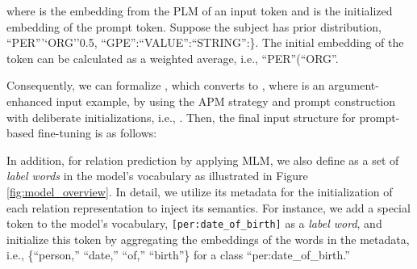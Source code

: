 \documentclass[11pt]{article}
\begin{document}
where  is the embedding from the PLM of an input token and  is the initialized embedding of the prompt token.
Suppose the subject has prior distribution, ``PER''’`ORG''0.5, ``GPE'':``VALUE'':``STRING'':\}.  The initial embedding of the  token can be calculated as a weighted average, i.e., ``PER''(``ORG''.


Consequently, we can formalize , which converts  to , where  is an argument-enhanced input example, by using the APM strategy and prompt construction with deliberate initializations, i.e., .
Then, the final input structure for prompt-based fine-tuning is as follows:



In addition, for relation prediction by applying MLM, we also define  as a set of \textit{label words} in the model's vocabulary as illustrated in Figure \ref{fig:model_overview}. In detail, we utilize its metadata for the initialization of each relation representation to inject its semantics. For instance, we add a special token to the model's vocabulary, \texttt{[per:date\_of\_birth]} as a \textit{label word}, and initialize this token by aggregating the embeddings of the words in the metadata, i.e., \{``person,'' ``date,'' ``of,'' ``birth''\} for a class ``per:date\_of\_birth.''
\end{document}

